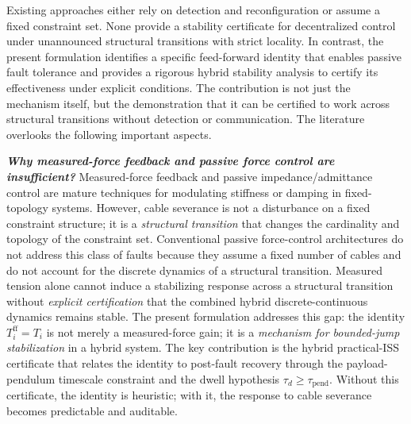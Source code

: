 
Existing approaches either rely on detection and reconfiguration or assume a fixed constraint set. None provide a stability certificate for decentralized control under unannounced structural transitions with strict locality. In contrast, the present formulation identifies a specific feed-forward identity that enables passive fault tolerance and provides a rigorous hybrid stability analysis to certify its effectiveness under explicit conditions. The contribution is not just the mechanism itself, but the demonstration that it can be certified to work across structural transitions without detection or communication. The literature overlooks the following important aspects.

\textbf{\textit{Why measured-force feedback and passive force control are insufficient?}} Measured-force feedback and passive impedance/admittance control are mature techniques for modulating stiffness or damping in fixed-topology systems. However, cable severance is not a disturbance on a fixed constraint structure; it is a \emph{structural transition} that changes the cardinality and topology of the constraint set. Conventional passive force-control architectures do not address this class of faults because they assume a fixed number of cables and do not account for the discrete dynamics of a structural transition. Measured tension alone cannot induce a stabilizing response across a structural transition without \emph{explicit certification} that the combined hybrid discrete-continuous dynamics remains stable. The present formulation addresses this gap: the identity $T_i^{\mathrm{ff}} = T_i$ is not merely a measured-force gain; it is a \emph{mechanism for bounded-jump stabilization} in a hybrid system. The key contribution is the hybrid practical-ISS certificate that relates the identity to post-fault recovery through the payload-pendulum timescale constraint and the dwell hypothesis $\tau_d \ge \tau_{\mathrm{pend}}$. Without this certificate, the identity is heuristic; with it, the response to cable severance becomes predictable and auditable.

